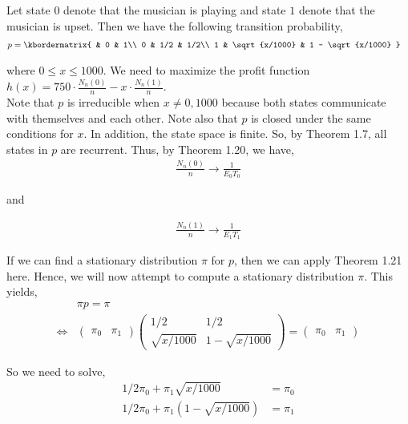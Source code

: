 \documentclass[12pt]{article}
\newenvironment{problem}[2][Problem]{\begin{trivlist}
\item[\hskip \labelsep {\bfseries #1}\hskip \labelsep {\bfseries #2.}]}{\end{trivlist}}
\begin{document}
\newpage
\begin{problem}{4}
\end{problem}

Let state $0$ denote that the musician is playing and state $1$ denote that the musician is upset. Then we have the following transition probability,
\begin{align*}
p &= \kbordermatrix{
    & 0 & 1\\
    0 & 1/2 & 1/2\\
    1 & \sqrt{x/1000} & 1 - \sqrt{x/1000}
  }
\end{align*}

where $0 \leq x \leq 1000$. We need to maximize the profit function $h(x) = 750 \cdot \frac{N_n(0)}{n} - x \cdot \frac{N_n(1)}{n}$.\\

Note that $p$ is irreducible when $x \neq 0, 1000$ because both states communicate with themselves and each other. Note also that $p$ is closed under the same conditions for $x$. In addition, the state space is finite. So, by Theorem 1.7, all states in $p$ are recurrent. Thus, by Theorem 1.20, we have,
\begin{align*}
\frac{N_n(0)}{n} \to \frac{1}{E_0T_0}
\end{align*}

and

\begin{align*}
\frac{N_n(1)}{n} \to \frac{1}{E_1T_1}
\end{align*}

If we can find a stationary distribution $\pi$ for $p$, then we can apply Theorem 1.21 here. Hence, we will now attempt to compute a stationary distribution $\pi$. This yields,
\begin{align*}
&\pi p = \pi\\
\iff &\begin{pmatrix}
\pi_0 & \pi_1
\end{pmatrix} \begin{pmatrix}
    1/2 & 1/2\\
    \sqrt{x/1000} & 1 - \sqrt{x/1000}
\end{pmatrix}
  = \begin{pmatrix}
\pi_0 & \pi_1
\end{pmatrix}
\end{align*}

So we need to solve,
\begin{align*}
1/2 \pi_0 + \pi_1 \sqrt{x/1000} &= \pi_0\\
1/2 \pi_0 + \pi_1 (1 - \sqrt{x/1000}) &= \pi_1
\end{align*}
\end{document}
